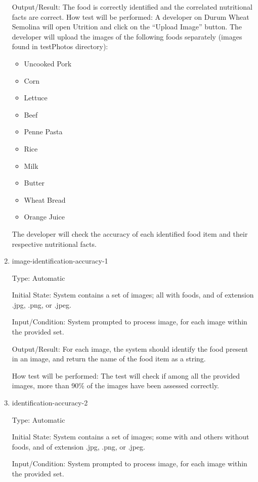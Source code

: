 \documentclass[12pt, titlepage]{article}
\begin{document}
\begin{enumerate}
		Output/Result: The food is correctly identified and the correlated nutritional facts are correct.
		How test will be performed: A developer on Durum Wheat Semolina will open Utrition and click on the “Upload Image” button. The developer will upload the images of the following foods separately (images found in testPhotos directory):
		\begin{itemize}
			\item Uncooked Pork
			\item Corn
			\item Lettuce
			\item Beef
			\item Penne Pasta
			\item Rice
			\item Milk
			\item Butter
			\item Wheat Bread
			\item Orange Juice
		\end{itemize} 
		
		The developer will check the accuracy of each identified food item and 
		their respective nutritional facts.
		
		\item{image-identification-accuracy-1\\}
		
		Type: Automatic
		
		Initial State: System contains a set of images; all with foods, and of 
		extension .jpg, .png, or .jpeg.
		
		Input/Condition: System prompted to process image, for each image 
		within the provided set.
		
		Output/Result: For each image, the system should identify the food 
		present in an image, and return the name of the food item as a string.
		
		How test will be performed: The test will check if among all the 
		provided images, more than 90\% of the images have been assessed 
		correctly.
		
		\item{identification-accuracy-2\\}
		
		Type: Automatic
		
		Initial State: System contains a set of images; some with and others 
		without foods, and of extension .jpg, .png, or 
		.jpeg.
		
		Input/Condition: System prompted to process image, for each image 
		within the provided set.
		

\end{enumerate}
\end{document}
